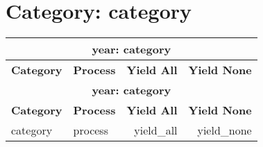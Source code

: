 \section*{Category: category}
\begin{longtable}[c]{|l|l|r|r|}
\hline
\multicolumn{4}{|c|}{\textbf{year: category}} \\
\hline
\textbf{Category} & \textbf{Process} & \textbf{Yield All} & \textbf{Yield None} \\
\hline
\endfirsthead
\hline
\multicolumn{4}{|c|}{\textbf{year: category}} \\
\hline
\textbf{Category} & \textbf{Process} & \textbf{Yield All} & \textbf{Yield None} \\
\hline
\endhead
category & process & yield_all & yield_none \\
\hline
\end{longtable}


